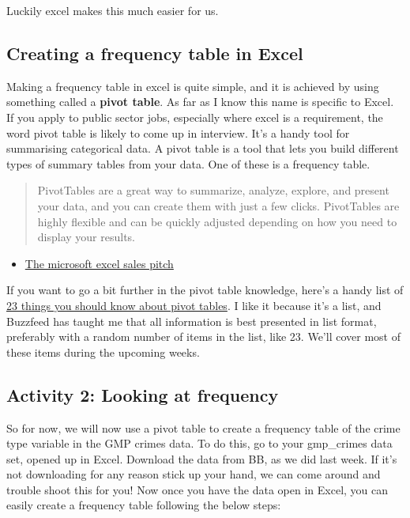 \documentclass[]{book}
\providecommand{\tightlist}{%
  \setlength{\itemsep}{0pt}\setlength{\parskip}{0pt}}
\theoremstyle{definition}
\theoremstyle{definition}
\theoremstyle{definition}
\theoremstyle{remark}
\begin{document}
Luckily excel makes this much easier for us.

\hypertarget{creating-a-frequency-table-in-excel}{%
\subsection{Creating a frequency table in
Excel}\label{creating-a-frequency-table-in-excel}}

Making a frequency table in excel is quite simple, and it is achieved by
using something called a \textbf{pivot table}. As far as I know this
name is specific to Excel. If you apply to public sector jobs,
especially where excel is a requirement, the word pivot table is likely
to come up in interview. It's a handy tool for summarising categorical
data. A pivot table is a tool that lets you build different types of
summary tables from your data. One of these is a frequency table.

\begin{quote}
PivotTables are a great way to summarize, analyze, explore, and present
your data, and you can create them with just a few clicks. PivotTables
are highly flexible and can be quickly adjusted depending on how you
need to display your results.
\end{quote}

\begin{itemize}
\tightlist
\item
  \href{https://support.office.com/en-gb/article/Create-a-PivotTable-to-analyze-worksheet-data-a9a84538-bfe9-40a9-a8e9-f99134456576}{The
  microsoft excel sales pitch}
\end{itemize}

If you want to go a bit further in the pivot table knowledge, here's a
handy list of
\href{https://exceljet.net/things-to-know-about-excel-pivot-tables}{23
things you should know about pivot tables}. I like it because it's a
list, and Buzzfeed has taught me that all information is best presented
in list format, preferably with a random number of items in the list,
like 23. We'll cover most of these items during the upcoming weeks.

\hypertarget{activity-2-looking-at-frequency}{%
\subsection{Activity 2: Looking at
frequency}\label{activity-2-looking-at-frequency}}

 So for now, we will now use a pivot table to create a frequency table
of the crime type variable in the GMP crimes data. To do this, go to
your gmp\_crimes data set, opened up in Excel. Download the data from
BB, as we did last week. If it's not downloading for any reason stick up
your hand, we can come around and trouble shoot this for you! Now once
you have the data open in Excel, you can easily create a frequency table
following the below steps:
\end{document}
